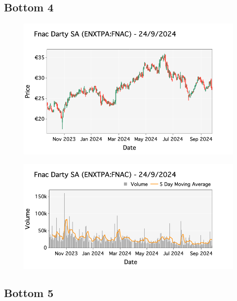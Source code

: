 \documentclass[a4paper, twocolumn, 11pt, paperequity]{gorgona}
\begin{document}
\subsection*{Bottom 4}

\begin{figure}[H]
    \centering
    \includegraphics[width=\columnwidth]{France/images/Bottom_Returns/Bottom_4_candlestick.png}
\end{figure}

\begin{figure}[H]
    \centering
    \includegraphics[width=\columnwidth]{France/images/Bottom_Returns/Bottom_4_volume.png}
\end{figure}

\subsection*{Bottom 5}
\end{document}
